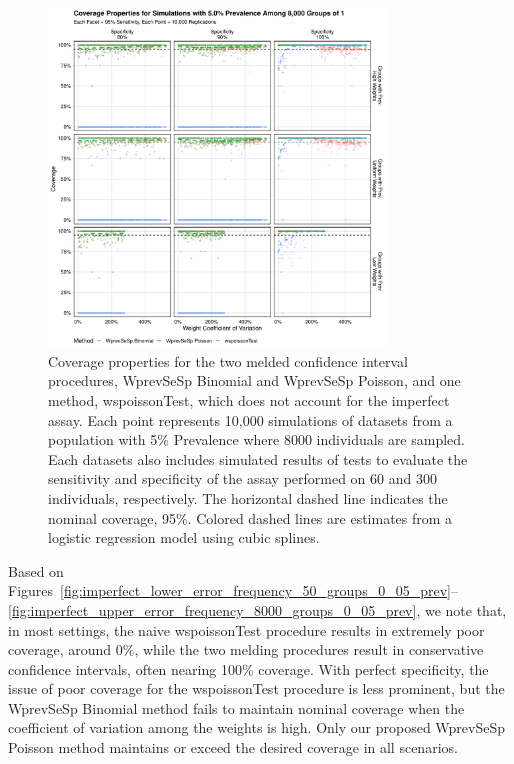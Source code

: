 \documentclass[AMA,STIX1COL]{WileyNJD-v2}
\begin{document}
\begin{figure}
\centering
\includegraphics[width=0.8\textwidth]{figures/imperfect_coverage_8000_groups_0_05_prev.pdf}
\caption{Coverage properties for the two melded confidence interval procedures, WprevSeSp Binomial and WprevSeSp Poisson, and one method, wspoissonTest, which does not account for the imperfect assay.
Each point represents 10,000 simulations of datasets from a population with 5\% Prevalence where 8000 individuals are sampled.
Each datasets also includes simulated results of tests to evaluate the sensitivity and specificity of the assay performed on 60 and 300 individuals, respectively.
The horizontal dashed line indicates the nominal coverage, 95\%.
Colored dashed lines are estimates from a logistic regression model using cubic splines.}
\label{fig:imperfect_coverage_8000_groups_0_05_prev}
\end{figure}

Based on Figures~\ref{fig:imperfect_lower_error_frequency_50_groups_0_05_prev}--\ref{fig:imperfect_upper_error_frequency_8000_groups_0_05_prev}, we note that, in most settings, the naive wspoissonTest procedure results in extremely poor coverage, around 0\%, while the two melding procedures result in conservative confidence intervals, often nearing 100\% coverage.
With perfect specificity, the issue of poor coverage for the wspoissonTest procedure is less prominent, but the WprevSeSp Binomial method fails to maintain nominal coverage when the coefficient of variation among the weights is high.
Only our proposed WprevSeSp Poisson method maintains or exceed the desired coverage in all scenarios.
\end{document}
